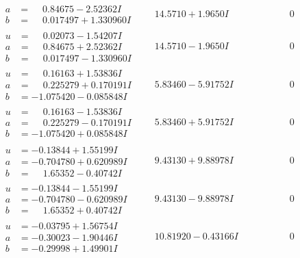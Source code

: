 \documentclass[1p]{elsarticle_modified}
\theoremstyle{definition}
\begin{document}
$$\begin{array}{c|c|c}
\begin{aligned}
a &= \phantom{-}0.84675 - 2.52362 I \\
b &= \phantom{-}0.017497 + 1.330960 I\end{aligned}
 & \phantom{-}14.5710 + 1.9650 I & \phantom{-0.000000 } 0 \\ \hline\begin{aligned}
u &= \phantom{-}0.02073 - 1.54207 I \\
a &= \phantom{-}0.84675 + 2.52362 I \\
b &= \phantom{-}0.017497 - 1.330960 I\end{aligned}
 & \phantom{-}14.5710 - 1.9650 I & \phantom{-0.000000 } 0 \\ \hline\begin{aligned}
u &= \phantom{-}0.16163 + 1.53836 I \\
a &= \phantom{-}0.225279 + 0.170191 I \\
b &= -1.075420 - 0.085848 I\end{aligned}
 & \phantom{-}5.83460 - 5.91752 I & \phantom{-0.000000 } 0 \\ \hline\begin{aligned}
u &= \phantom{-}0.16163 - 1.53836 I \\
a &= \phantom{-}0.225279 - 0.170191 I \\
b &= -1.075420 + 0.085848 I\end{aligned}
 & \phantom{-}5.83460 + 5.91752 I & \phantom{-0.000000 } 0 \\ \hline\begin{aligned}
u &= -0.13844 + 1.55199 I \\
a &= -0.704780 + 0.620989 I \\
b &= \phantom{-}1.65352 - 0.40742 I\end{aligned}
 & \phantom{-}9.43130 + 9.88978 I & \phantom{-0.000000 } 0 \\ \hline\begin{aligned}
u &= -0.13844 - 1.55199 I \\
a &= -0.704780 - 0.620989 I \\
b &= \phantom{-}1.65352 + 0.40742 I\end{aligned}
 & \phantom{-}9.43130 - 9.88978 I & \phantom{-0.000000 } 0 \\ \hline\begin{aligned}
u &= -0.03795 + 1.56754 I \\
a &= -0.30023 - 1.90446 I \\
b &= -0.29998 + 1.49901 I\end{aligned}
 & \phantom{-}10.81920 - 0.43166 I & \phantom{-0.000000 } 0 \\ \hline\begin{aligned}

\end{aligned}
\end{array}$$
\end{document}
